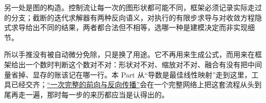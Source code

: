 另一处是图的构造。控制流让每一次的图形状都可能不同，框架必须记录实际走过的分支；截断的迭代求解器有两种反向语义，对执行的有限步求导与对收敛方程隐式求导给出不同的结果，两者都合法但不相等，选哪一种是建模决定而非实现细节。

所以手推没有被自动微分免除，只是换了用途。它不再用来生成公式，而用来在框架给出一个数时判断这个数对不对：形状对不对、缩放对不对、融合有没有把中间量省掉、显存的账该记在哪一行。本 Part 从``导数是最佳线性映射''走到这里，工具已经交齐；\hyperref[sec:14-Deep-Learning/02-Losses-and-Backpropagation/02]{``一次完整的前向与反向传播''}会在一个完整网络上把这套流程从头到尾再走一遍，那时每一步的来历都应当是认得出的。
